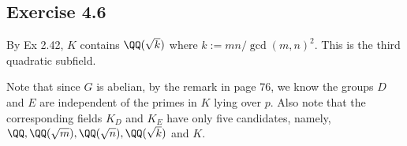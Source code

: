 \documentclass[../Chapter.tex]{subfiles}
\begin{document}
\begin{comment}
It's remaining to show that $H$ is normal in $G$. Note that for each $\sigma\in G$, $\sigma H\sigma^{-1}$ forms another subgroup with $\#(\sigma H\sigma^{-1})=\#(H)$. And by the uniqueness, we have $\sigma H\sigma^{-1}=H$. This means $H$ is normal in $G$.

Let's show the groups have the desired properties. If there are distinct prime divisors $p,q$ of $\#(G)$, then by Cauchy's theorem, $\exists \sigma,\tau\in G$ with order $p,q$, respectively. Since $H$ is the smallest subgroup, $H\subseteq \langle\sigma\rangle,\langle\tau\rangle$. This implies $\#(H)\mid p,q$ and so $\#(H)=1$, which is absurd. So $\#(G)$ is a prime power. Consequently, $H$ must have prime order. Lastly, $H\subset Z(G)$ is clear.

(e) Similar to (d), we assume there's at least one intermediate field $K'$. And let $K'$ be the compositum of all intermediate fields, $H$ be the corresponding subgroup in $G$. Since this time $P$ splits completely in every intermediate field. By Thm 31 again, $P$ splits completely in $K'$. Thus we have $K'\varsubsetneq L$. The remaining arguments are exactly the same in (d).

As an example, let $K=\QQ$ and $L=\QQ(e^{2\pi i/5})$. We know $G=(\ZZ/5\ZZ)^\times\simeq C_4$, the cyclic group of order $4$. There's only one subgroup in $C_4$, namely, $\{0,2\}$. So by Galois correspondence, there's only one intermediate field. Moreover, by Ex 2.8, we know this field is $\QQ(\sqrt{5})$. Note that the corresponding subgroup $H$ is isomorphic to $\{0,2\}$, which clearly has the desired properties.

Consider $p=11$. Since $5$ is a square mod $11$, by Thm 25 (p. 52), we have $11$ splits completely in $\QQ(\sqrt{5})$. Moreover, by Thm 26 (p. 53), $f$ is the order of $11$ in $(\ZZ/5\ZZ)^\times$, which is $2$. So $11$ does not split completely in $L=\QQ(e^{2\pi i/5})$.
\end{comment}

\subsection*{Exercise 4.6}

By Ex 2.42, $K$ contains $\QQ(\sqrt{k})$ where $k:=mn/\gcd(m,n)^2$. This is the third quadratic subfield.

Note that since $G$ is abelian, by the remark in page 76, we know the groups $D$ and $E$ are independent of the primes in $K$ lying over $p$. Also note that the corresponding fields $K_D$ and $K_E$ have only five candidates, namely, $\QQ,\QQ(\sqrt{m}),\QQ(\sqrt{n}),\QQ(\sqrt{k})$ and $K$.
\end{document}
